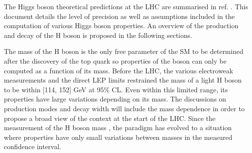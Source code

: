 The Higgs boson theoretical predictions at the LHC are summarised in ref. \cite{CERN-2013-004}.
This document details the level of precision as well as assumptions included in the computation of various Higgs boson properties.
An overview of the production and decay of the H boson is proposed in the following sections.

The mass of the H boson is the only free parameter of the SM to be determined after the discovery of the top quark \cite{Abe:1995hr} so properties of the boson can only be computed as a function of its mass.
Before the LHC, the various electroweak measurements \cite{LEPEWWG} and the direct LEP limits \cite{CERN-EP-2003-011} restrained the mass of a light H boson to be within [114, 152] GeV at 95\% CL.
Even within this limited range, its properties have large variations depending on its mass.
The discussions on production modes and decay width will include the mass dependence in order to propose a broad view of the context at the start of the LHC.
Since the measurement of the H boson mass \cite{CERN-PH-EP-2015-075}, the paradigm has evolved to a situation where properties have only small variations between masses in the measured confidence interval.



